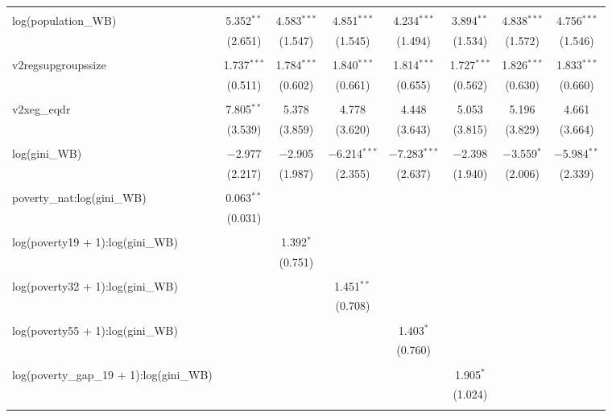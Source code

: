 \documentclass[a4paper, 12pt]{article}
\begin{document}
\begin{table}[!htbp]
{\begin{tabular}{@{\extracolsep{5pt}}lccccccc}
  & & & & & & & \\ 
 log(population\_WB) & 5.352$^{**}$ & 4.583$^{***}$ & 4.851$^{***}$ & 4.234$^{***}$ & 3.894$^{**}$ & 4.838$^{***}$ & 4.756$^{***}$ \\ 
  & (2.651) & (1.547) & (1.545) & (1.494) & (1.534) & (1.572) & (1.546) \\ 
  & & & & & & & \\ 
 v2regsupgroupssize & 1.737$^{***}$ & 1.784$^{***}$ & 1.840$^{***}$ & 1.814$^{***}$ & 1.727$^{***}$ & 1.826$^{***}$ & 1.833$^{***}$ \\ 
  & (0.511) & (0.602) & (0.661) & (0.655) & (0.562) & (0.630) & (0.660) \\ 
  & & & & & & & \\ 
 v2xeg\_eqdr & 7.805$^{**}$ & 5.378 & 4.778 & 4.448 & 5.053 & 5.196 & 4.661 \\ 
  & (3.539) & (3.859) & (3.620) & (3.643) & (3.815) & (3.829) & (3.664) \\ 
  & & & & & & & \\ 
 log(gini\_WB) & $-$2.977 & $-$2.905 & $-$6.214$^{***}$ & $-$7.283$^{***}$ & $-$2.398 & $-$3.559$^{*}$ & $-$5.984$^{**}$ \\ 
  & (2.217) & (1.987) & (2.355) & (2.637) & (1.940) & (2.006) & (2.339) \\ 
  & & & & & & & \\ 
 poverty\_nat:log(gini\_WB) & 0.063$^{**}$ &  &  &  &  &  &  \\ 
  & (0.031) &  &  &  &  &  &  \\ 
  & & & & & & & \\ 
 log(poverty19 + 1):log(gini\_WB) &  & 1.392$^{*}$ &  &  &  &  &  \\ 
  &  & (0.751) &  &  &  &  &  \\ 
  & & & & & & & \\ 
 log(poverty32 + 1):log(gini\_WB) &  &  & 1.451$^{**}$ &  &  &  &  \\ 
  &  &  & (0.708) &  &  &  &  \\ 
  & & & & & & & \\ 
 log(poverty55 + 1):log(gini\_WB) &  &  &  & 1.403$^{*}$ &  &  &  \\ 
  &  &  &  & (0.760) &  &  &  \\ 
  & & & & & & & \\ 
 log(poverty\_gap\_19 + 1):log(gini\_WB) &  &  &  &  & 1.905$^{*}$ &  &  \\ 
  &  &  &  &  & (1.024) &  &  \\ 
  & & & & & & & \\ 

\end{tabular}}
\end{table}
\end{document}
